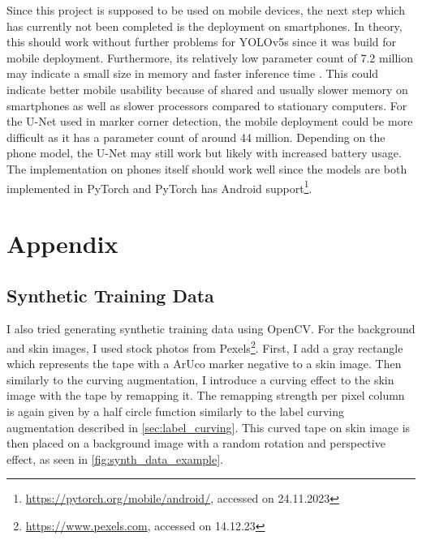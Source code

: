 \documentclass[10pt]{book}
\newcommand{\figureref}[1]{\autoref{#1}}
\begin{document}

Since this project is supposed to be used on mobile devices, the next step which has currently not been completed is the deployment on smartphones. In theory, this should work without further problems for \ac{YOLO}v5s since it was build for mobile deployment. Furthermore, its relatively low parameter count of 7.2 million may indicate a small size in memory and faster inference time \cite{wang2023yolov7}. This could indicate better mobile usability because of shared and usually slower memory on smartphones as well as slower processors compared to stationary computers. For the U-Net used in marker corner detection, the mobile deployment could be more difficult as it has a parameter count of around 44 million. Depending on the phone model, the U-Net may still work but likely with increased battery usage. The implementation on phones itself should work well since the models are both implemented in PyTorch and PyTorch has Android support\footnote{\url{https://pytorch.org/mobile/android/}, accessed on 24.11.2023}.


\chapter{Appendix}

\section{Synthetic Training Data}
\label{sec:synth_data}

I also tried generating synthetic training data using OpenCV. For the background and skin images, I used stock photos from Pexels\footnote{\url{https://www.pexels.com}, accessed on 14.12.23}. First, I add a gray rectangle which represents the tape with a \ac{ArUco} marker negative to a skin image. Then similarly to the curving augmentation, I introduce a curving effect to the skin image with the tape by remapping it. The remapping strength per pixel column is again given by a half circle function similarly to the label curving augmentation described in \autoref{sec:label_curving}. This curved tape on skin image is then placed on a background image with a random rotation and perspective effect, as seen in \figureref{fig:synth_data_example}.
\end{document}
